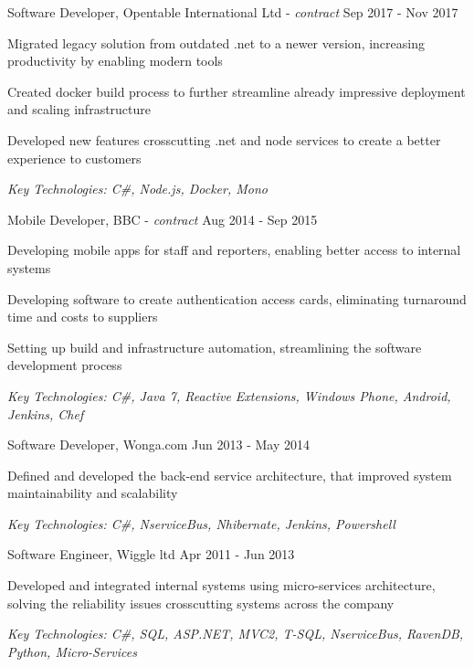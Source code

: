 \documentclass[11pt,article,oneside]{memoir}
\newenvironment{itemize*}{%
  \renewcommand\labelitemi{\textbullet}
  \footnotesize
  \begin{itemize}%
    \setlength{\itemsep}{0pt}}%
  {\end{itemize}
}
\begin{document}
\normalsize
\medskip
\ind Software Developer, Opentable International Ltd - \emph{contract} \hfill Sep 2017 - Nov 2017
\begin{itemize*}
  \item Migrated legacy solution from outdated .net to a newer version, increasing productivity by enabling modern tools 
  \item Created docker build process to further streamline already impressive deployment and scaling infrastructure 
  \item Developed new features crosscutting .net and node services to create a better experience to customers
\end{itemize*}
\ind \hspace{0.35in} \footnotesize \emph{Key Technologies: C\#, Node.js, Docker, Mono}

\normalsize
\medskip
\ind Mobile Developer, BBC - \emph{contract} \hfill Aug 2014 - Sep 2015
\begin{itemize*}
  \item Developing mobile apps for staff and reporters, enabling better access to internal systems
  \item Developing software to create authentication access cards, eliminating turnaround time and costs to suppliers
  \item Setting up build and infrastructure automation, streamlining the software development process
\end{itemize*}
\ind \hspace{0.35in} \footnotesize \emph{Key Technologies: C\#, Java 7, Reactive Extensions, Windows Phone, Android, Jenkins, Chef}

\normalsize
\medskip
\ind Software Developer, Wonga.com \hfill Jun 2013 - May 2014
\begin{itemize*}
  \item Defined and developed the back-end service architecture, that improved system maintainability and scalability
\end{itemize*}
\ind \hspace{0.35in} \footnotesize \emph{Key Technologies: C\#, NserviceBus, Nhibernate, Jenkins, Powershell}

\normalsize
\medskip
\ind Software Engineer, Wiggle ltd \hfill Apr 2011 - Jun 2013
\begin{itemize*}
  \item Developed and integrated internal systems using micro-services architecture, solving the reliability issues crosscutting systems across the company 
\end{itemize*}
\ind \hspace{0.35in} \footnotesize \emph{Key Technologies: C\#, SQL, ASP.NET, MVC2, T-SQL, NserviceBus, RavenDB, Python, Micro-Services}
\end{document}
